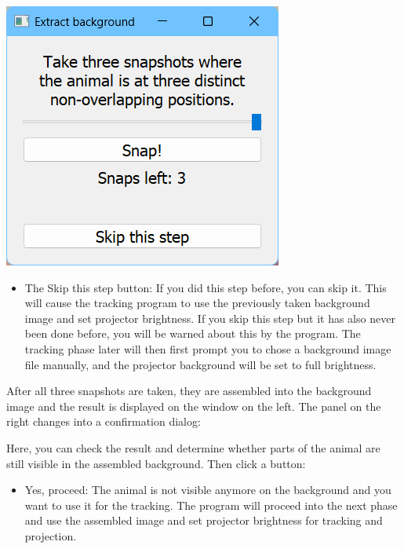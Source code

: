 \documentclass[12pt]{article}
\begin{document}
\begin{minipage}[t]{0.45\textwidth}
	\vspace{0pt}
	\includegraphics*[width=\textwidth]{images/bcapsnap.png}
\end{minipage}
\begin{itemize}
	\item The Skip this step button: If you did this step before, you can skip it. This will cause the tracking program to use the previously taken background image and set projector brightness. If you skip this step but it has also never been done before, you will be warned about this by the program. The tracking phase later will then first prompt you to chose a background image file manually, and the projector background will be set to full brightness.
\end{itemize}
\fnl
After all three snapshots are taken, they are assembled into the background image and the result is displayed on the window on the left. The panel on the right changes into a confirmation dialog:\\
\begin{minipage}[t]{0.45\textwidth}
	\vspace{0pt}
	Here, you can check the result and determine whether parts of the animal are still visible in the assembled background. Then click a button:
	\begin{itemize}
		\item Yes, proceed: The animal is not visible anymore on the background and you want to use it for the tracking. The program will proceed into the next phase and use the assembled image and set projector brightness for tracking and projection.
	\end{itemize}
\end{minipage}
\end{document}
